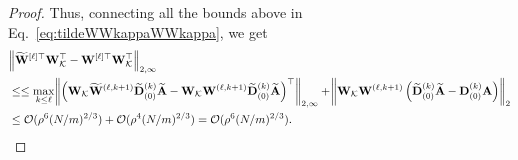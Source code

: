 \begin{proof}
	\iffalse
	Also, from Lemma~\ref{lemma:norm_ESN}, we have for any $k \le L$, w.p. at least $1-e^{-\Omega(\rho^2)}$,
	\begin{align*}
		\norm{\mathbf{W}^{(\ell, k+1)}} = \norm{\mathbf{D}^{(k)} \mathbf{W} \mathbf{D}^{(k-1)} \mathbf{W} \cdots \mathbf{D}^{(2)} \mathbf{W}} \le \mathcal{O}(L^3).
	\end{align*}
	From Fact~\ref{thm:norm_W}, we can show that with probability exceeding $1 - e^{-\rho^2}$,
	\begin{align*}
		\norm{\mathbf{W}_{\mathcal{K}}} \le \sqrt{2/m}(\sqrt{N} + \sqrt{m} + \sqrt{2} \rho) = \sqrt{2} (1 + (N/m)^{1/2} + \sqrt{2} \rho m^{-1/2}) \le 5,
	\end{align*}
	since $m \ge \max(\rho, N)$. Following the exact steps required to get Eq.~\ref{eq:DAtilde_DA}, we get thatwith probability exceeding $1 - e^{-\rho^2}$,
	\begin{align*}
		\norm{\widetilde{\mathbf{D}}_{(0)}^{(k)} \widetilde{\mathbf{A}} - \mathbf{D}_{(0)}^{(k)} \mathbf{A}}_2 \le \mathcal{O}(\rho^{7/2}(N/m)^{1/6}).
	\end{align*}
	\fi
	Thus, connecting all the bounds above in Eq.~\ref{eq:tildeWWkappaWWkappa}, we get 
	\begin{align}
		&\norm{\widetilde{\mathbf{W}}^{[\ell]\top} \mathbf{W}_{\mathcal{K}}^{\top} - \mathbf{W}^{[\ell]\top} \mathbf{W}_{\mathcal{K}}^{\top} }_{2, \infty} \nonumber\\&
		\le 
		\le\max_{k \le \ell} \norm{\left(\mathbf{W}_{\mathcal{K}} \widetilde{\mathbf{W}}^{(\ell, k+1)} \widetilde{\mathbf{D}}_{(0)}^{(k)} \widetilde{\mathbf{A}} - \mathbf{W}_{\mathcal{K}} \mathbf{W}^{(\ell, k+1)} \widetilde{\mathbf{D}}_{(0)}^{(k)} \widetilde{\mathbf{A}}\right)^{\top}}_{2, \infty} + \norm{\mathbf{W}_{\mathcal{K}} \mathbf{W}^{(\ell, k+1)} \left(\widetilde{\mathbf{D}}_{(0)}^{(k)} \widetilde{\mathbf{A}} - \mathbf{D}_{(0)}^{(k)} \mathbf{A}\right)}_2 \nonumber \\&
		\le \mathcal{O}(\rho^6 (N/m)^{2/3}) + \mathcal{O}(\rho^4 (N/m)^{2/3}) = \mathcal{O}(\rho^6 (N/m)^{2/3}) \label{eq:tmp_W_MATHCALwl}.
	\end{align}
\end{proof}


\iffalse

\begin{corollary}\label{cor:Invertibility_ESN}
	For a given sequence $\bx^{(1)}, \cdots, \bx^{(\ell)}$, 
	\begin{align*}
		&\norm{[\bx^{(1)}, \cdots, \bx^{(L)}] - \obW^{(L)\top} \mathbf{h}^{(L)}}_\infty \\&\quad \leq \mathcal{O}\left(\rho^5 m^{-1/8} \sqrt{L} \right) \cdot \left(2(\sqrt{2} + \rho m^{-0.5})\right)^{L+1} \sqrt{2} (1 + \sqrt{dm^{-1}} + \sqrt{2}\rho m^{-0.5}),
	\end{align*}
	with probability at least $1 - L^2 d \rho^{6} m^{3/4}  e^{-\Omega(\rho^2)}$, provided $m \ge \Omega(\rho^{22})$. 
\end{corollary}
\fi 

